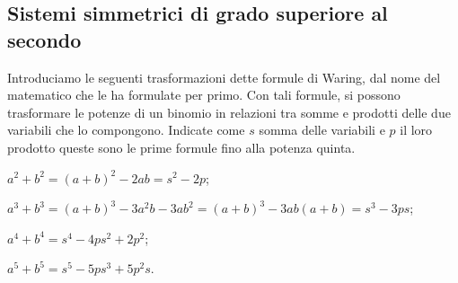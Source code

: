 \subsection{Sistemi simmetrici di grado superiore al secondo}
Introduciamo le seguenti trasformazioni dette formule di Waring, dal nome del matematico che le ha formulate per primo. Con tali formule, si possono trasformare le potenze di un binomio in relazioni tra somme e prodotti delle due variabili che lo compongono. Indicate come $s$ somma delle variabili e $p$ il loro prodotto queste sono le prime formule fino alla potenza quinta.
\begin{itemize*}
\item $ a^2+b^2=(a+b)^2-2{ab}=s^2-2p $;
\item $ a^3+b^3=(a+b)^3-3a^2b-3ab^2=(a+b)^3-3{ab}(a+b)=s^3-3{ps} $;
\item $ a^4+b^4=s^4-4{ps}^2+2p^2 $;
\item $ a^5+b^5=s^5-5{ps}^3+5p^2s $.
\end{itemize*}

